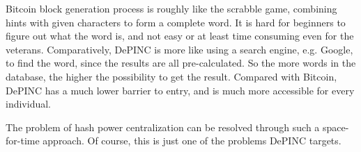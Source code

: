 \begin{flushleft}
    Bitcoin block generation process is roughly like the scrabble game, combining hints with given characters to form a complete word. It is hard for beginners to figure out what the word is, and not easy or at least time consuming even for the veterans. Comparatively, DePINC is more like using a search engine, e.g. Google, to find the word, since the results are all pre-calculated. So the more words in the database, the higher the possibility to get the result. Compared with Bitcoin, DePINC has a much lower barrier to entry, and is much more accessible for every individual.
\end{flushleft}
\begin{flushleft}
    The problem of hash power centralization can be resolved through such a space-for-time approach. Of course, this is just one of the problems DePINC targets.
\end{flushleft}
